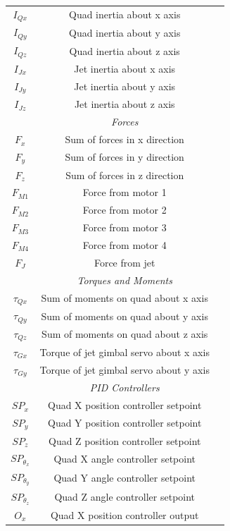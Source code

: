 \documentclass[11pt]{article}
\begin{document}
\begin{center}
\begin{longtable}{|ccc|}
    \hline
    $I_{Qx}$ & Quad inertia about x axis & \\
    $I_{Qy}$ & Quad inertia about y axis & \\
    $I_{Qz}$ & Quad inertia about z axis & \\
    $I_{Jx}$ & Jet inertia about x axis & \\
    $I_{Jy}$ & Jet inertia about y axis & \\
    $I_{Jz}$ & Jet inertia about z axis & \\
    \hline
    & \emph{Forces} & \\
    \hline
    $F_x$ & Sum of forces in x direction & \\
    $F_y$ & Sum of forces in y direction & \\
    $F_z$ & Sum of forces in z direction & \\
    $F_{M1}$ & Force from motor 1 & \\
    $F_{M2}$ & Force from motor 2 & \\
    $F_{M3}$ & Force from motor 3 & \\
    $F_{M4}$ & Force from motor 4 & \\
    $F_J$ & Force from jet & \\
    \hline
    & \emph{Torques and Moments} & \\
    \hline
    $\tau_{Qx}$ & Sum of moments on quad about x axis & \\
    $\tau_{Qy}$ & Sum of moments on quad about y axis & \\
    $\tau_{Qz}$ & Sum of moments on quad about z axis & \\
    $\tau_{Gx}$ & Torque of jet gimbal servo about x axis & \\
    $\tau_{Gy}$ & Torque of jet gimbal servo about y axis & \\
    \hline
    & \emph{PID Controllers} & \\
    \hline
    $SP_x$ & Quad X position controller setpoint & \\
    $SP_y$ & Quad Y position controller setpoint & \\
    $SP_z$ & Quad Z position controller setpoint & \\
    $SP_{\theta_x}$ & Quad X angle controller setpoint & \\
    $SP_{\theta_y}$ & Quad Y angle controller setpoint & \\
    $SP_{\theta_z}$ & Quad Z angle controller setpoint & \\
    $O_x$ & Quad X position controller output & \\

\end{longtable}
\end{center}
\end{document}
